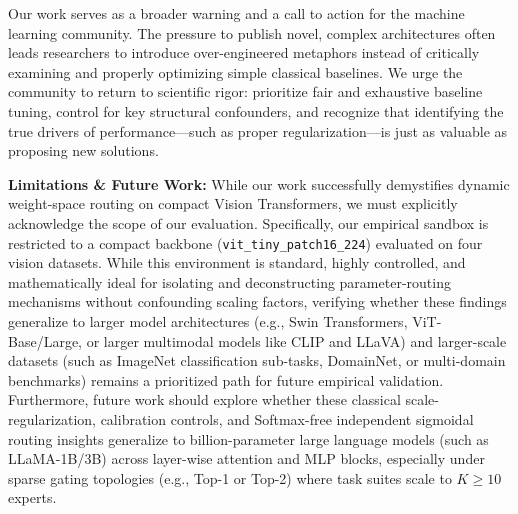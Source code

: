 Our work serves as a broader warning and a call to action for the machine learning community. The pressure to publish novel, complex architectures often leads researchers to introduce over-engineered metaphors instead of critically examining and properly optimizing simple classical baselines. We urge the community to return to scientific rigor: prioritize fair and exhaustive baseline tuning, control for key structural confounders, and recognize that identifying the true drivers of performance—such as proper regularization—is just as valuable as proposing new solutions.

\textbf{Limitations \& Future Work:} While our work successfully demystifies dynamic weight-space routing on compact Vision Transformers, we must explicitly acknowledge the scope of our evaluation. Specifically, our empirical sandbox is restricted to a compact backbone (\texttt{vit\_tiny\_patch16\_224}) evaluated on four vision datasets. While this environment is standard, highly controlled, and mathematically ideal for isolating and deconstructing parameter-routing mechanisms without confounding scaling factors, verifying whether these findings generalize to larger model architectures (e.g., Swin Transformers, ViT-Base/Large, or larger multimodal models like CLIP and LLaVA) and larger-scale datasets (such as ImageNet classification sub-tasks, DomainNet, or multi-domain benchmarks) remains a prioritized path for future empirical validation. Furthermore, future work should explore whether these classical scale-regularization, calibration controls, and Softmax-free independent sigmoidal routing insights generalize to billion-parameter large language models (such as LLaMA-1B/3B) across layer-wise attention and MLP blocks, especially under sparse gating topologies (e.g., Top-1 or Top-2) where task suites scale to $K \ge 10$ experts.
